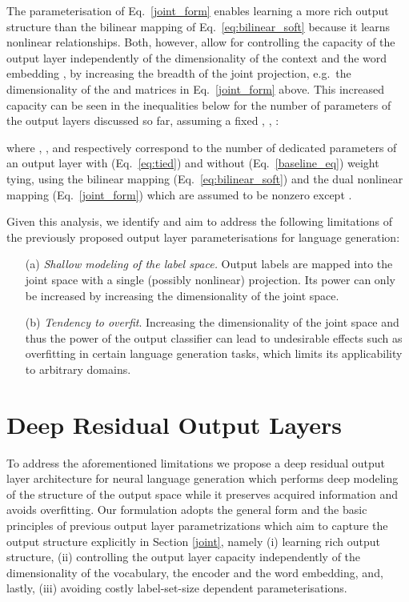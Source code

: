 \documentclass{article}
\begin{document}
The parameterisation of Eq.~\ref{joint_form} enables learning a more rich output structure than the bilinear mapping of Eq.~\ref{eq:bilinear_soft} because it learns nonlinear relationships.  Both, however, allow for controlling the capacity of the output layer independently of the dimensionality of the context  and the word embedding , by increasing the breadth of the joint projection, e.g.~the dimensionality of the  and  matrices in Eq.~\ref{joint_form} above. This increased capacity can be seen in the inequalities below for the number of parameters of the output layers discussed so far, assuming a fixed , , :

where ,  ,   and  respectively correspond to the number of dedicated parameters of an  output layer with (Eq.~\ref{eq:tied}) and without (Eq.~\ref{baseline_eq}) weight tying, using the bilinear mapping (Eq.~\ref{eq:bilinear_soft}) and the dual nonlinear mapping (Eq.~\ref{joint_form}) which are assumed to be nonzero except . 
    
Given this analysis, we identify and aim to address the following limitations of the previously proposed output layer parameterisations for language generation: \
\begin{itemize}
    \item[(a)] \textit{Shallow modeling of the label space.} Output labels are mapped into the joint space with a single (possibly nonlinear) projection.  Its power can only be increased by increasing the dimensionality of the joint space.
    \item[(b)] \textit{Tendency to overfit}. Increasing the dimensionality of the joint space and thus the power of the output classifier can lead to undesirable effects such as overfitting in certain language generation tasks, which limits its applicability to arbitrary domains.   
\end{itemize}  
 


\section{Deep Residual Output Layers} 
\label{model}
To address the aforementioned limitations we propose a deep residual output layer architecture for neural language generation which performs deep modeling of the structure of the output space while it preserves acquired information and avoids overfitting. Our formulation adopts the general form and the basic principles of previous output layer parametrizations which aim to capture the output structure explicitly in Section \ref{joint}, namely (i) learning rich output structure, (ii) controlling the output layer capacity independently of the dimensionality of the vocabulary, the encoder and the word embedding, and, lastly, (iii)  avoiding costly label-set-size dependent parameterisations.  
\end{document}
